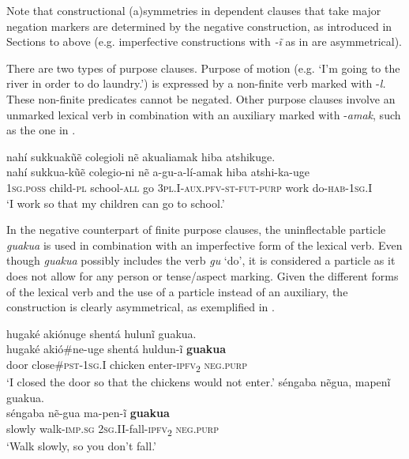 \documentclass[output=paper,colorlinks,citecolor=brown]{langscibook}
\begin{document}
Note that constructional (a)symmetries in dependent clauses that take major negation markers are determined by the negative construction, as introduced in Sections  to  above (e.g. imperfective constructions with \textit{{}-\~{i} } as in  are asymmetrical). 

There are two types of purpose clauses. Purpose of motion (e.g. ‘I'm going to the river in order to do laundry.’) is expressed by a non-finite verb marked with -\textit{l.} These non-finite predicates cannot be negated. Other purpose clauses involve an unmarked lexical verb in combination with an auxiliary marked with -\textit{amak}, such as the one in .

\ea\label{ex:kog:54} nahí sukkuakũẽ colegioli nẽ akualiamak hiba atshikuge.\\
    \gll nahí sukkua-kũẽ colegio-ni nẽ a-gu-a-lí-amak hiba atshi-ka-uge \\
          \textsc{1sg.poss} child{}-\textsc{pl} school-\textsc{all} go \textsc{3pl.I{}-aux.pfv-st{}-fut-purp}  work do-\textsc{hab-1sg.I}\\
    \glt ‘I work so that my children can go to school.’
\z 

In the negative counterpart of finite purpose clauses, the uninflectable particle \textit{guakua} is used in combination with an imperfective form of the lexical verb. Even though \textit{guakua} possibly includes the verb \textit{gu} ‘do’, it is considered a particle as it does not allow for any person or tense/aspect marking. Given the different forms of the lexical verb and the use of a particle instead of an auxiliary, the construction is clearly asymmetrical, as exemplified in .

\ea\label{ex:kog:55}
    \ea\label{ex:kog:55a}hugaké akiónuge shentá  hulunĩ  guakua.\\
        \gll  hugaké akió\#ne-uge shentá  huldun-ĩ \textbf{guakua}\\ 
              door close\#\textsc{pst-1sg.I} chicken enter-\textsc{ipfv}\textsc{\textsubscript{2}} \textsc{neg.purp}\\
        \glt  ‘I closed the door so that the chickens would not enter.’
    \ex\label{ex:kog:55b}séngaba nẽgua, mapenĩ guakua.\\
        \gll  séngaba nẽ{}-gua ma{}-pen-ĩ \textbf{guakua}\\
              slowly walk-\textsc{imp.sg} \textsc{2sg.II{}-}fall-\textsc{ipfv}\textsc{\textsubscript{2}} \textsc{neg.purp}\\
        \glt  ‘Walk slowly, so you don't fall.’
    \z
\z 
\end{document}
